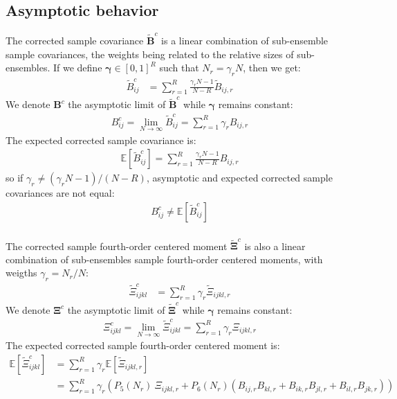 \documentclass[12pt]{scrartcl}
\begin{document}
\subsection{Asymptotic behavior}
The corrected sample covariance $\widetilde{\mathbf{B}}^c$ is a linear combination of sub-ensemble sample covariances, the weights being related to the relative sizes of sub-ensembles. If we define $\boldsymbol{\gamma} \in [0,1]^R$ such that $N_r = \gamma_r N$, then we get:
\begin{align}
\widetilde{B}^c_{ij} & = \sum_{r=1}^R \frac{\gamma_r N-1}{N-R} \widetilde{B}_{ij,r}
\end{align}
We denote $\mathbf{B}^c$ the asymptotic limit of $\widetilde{\mathbf{B}}^c$ while $\boldsymbol{\gamma}$ remains constant:
\begin{align}
B^c_{ij} = \lim_{N \rightarrow \infty} \widetilde{B}^c_{ij} = \sum_{r=1}^R \gamma_r B_{ij,r}
\end{align}
The expected corrected sample covariance is:
\begin{align}
\mathbb{E} \left[\widetilde{B}^c_{ij}\right] =  \sum_{r=1}^R \frac{\gamma_r N-1}{N-R} B_{ij,r}
\end{align}
so if $\gamma_r \ne (\gamma_r N-1)/(N-R)$, asymptotic and expected corrected sample covariances are not equal:
\begin{align}
B^c_{ij} \ne \mathbb{E} \left[\widetilde{B}^c_{ij}\right]
\end{align}
$  $\\
The corrected sample fourth-order centered moment $\widetilde{\boldsymbol{\Xi}}^c$ is also a linear combination of sub-ensembles sample fourth-order centered moments, with weigths $\gamma_r = N_r/N$:
\begin{align}
\widetilde{\Xi}^c_{ijkl} & = \sum_{r=1}^R \gamma_r \widetilde{\Xi}_{ijkl,r}
\end{align}
We denote $\boldsymbol{\Xi}^c$ the asymptotic limit of $\widetilde{\boldsymbol{\Xi}}^c$ while $\boldsymbol{\gamma}$ remains constant:
\begin{align}
\Xi^c_{ijkl} = \lim_{N \rightarrow \infty} \widetilde{\Xi}^c_{ijkl} = \sum_{r=1}^R \gamma_r \Xi_{ijkl,r}
\end{align}
The expected corrected sample fourth-order centered moment is:
\begin{align}
\mathbb{E} \left[\widetilde{\Xi}^c_{ijkl}\right] & = \sum_{r=1}^R \gamma_r \mathbb{E} \left[\widetilde{\Xi}_{ijkl,r}\right] \nonumber \\
& = \sum_{r=1}^R \gamma_r \left(P_5(N_r) \ \Xi_{ijkl,r} + P_6(N_r) \left(B_{ij,r}B_{kl,r} + B_{ik,r}B_{jl,r} + B_{il,r}B_{jk,r} \right)\right)
\end{align}
\end{document}

